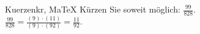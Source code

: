 \begin{MAufgabe}{Kuerzen}{kr, MaTeX}
K\"urzen Sie soweit m\"oglich: $\frac{99}{828}$.\\ 
\ifLsg\MLoesung
\quad $\frac{99}{828}=\frac{(9)\cdot(11)}{(9)\cdot(92)}=\frac{11}{92}$.\else\relax\fi
 \end{MAufgabe}